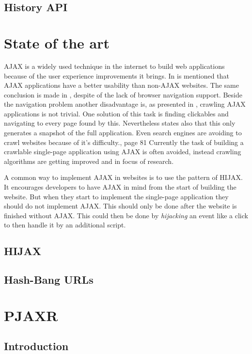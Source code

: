 \documentclass[f,bachelor,binding,twoside,palatino]{WeSTthesis}
\def \ajax {AJAX}
\def \pjaxr {PJAXR}
\def \hijax {HIJAX}
\def \singlePageApplication {single-page application}
\begin{document}
\subsection{History API}

\section{State of the art}
\ajax{} is a widely used technique in the internet to build web applications because of the user experience improvements it brings.
In \cite{roodt06} is mentioned that \ajax{} applications have a better usability than non-\ajax{} websites.
The same conclusion is made in \cite{klugeKarglWeber07}, despite of the lack of browser navigation support.
Beside the navigation problem another disadvantage is, as presented in \cite{mesbah09}, crawling \ajax{} applications is not trivial.
One solution of this task is finding clickables and navigating to every page found by this.
Nevertheless \cite{mesbah09} states also that this only generates a snapshot of the full application.
Even search engines are avoiding to crawl websites because of it's difficulty.\cite{matter08}, page 81
Currently the task of building a crawlable \singlePageApplication{} using \ajax{} is often avoided, instead crawling algorithms are getting improved and in focus of research.

A common way to implement \ajax{} in websites is to use the pattern of HIJAX.
It encourages developers to have \ajax{} in mind from the start of building the website. 
But when they start to implement the \singlePageApplication{} they should do not implement \ajax{}.
This should only be done after the website is finished without \ajax{}.
This could then be done by \emph{hijacking} an event like a click to then handle it by an additional script.

\subsection{\hijax{}}

\subsection{Hash-Bang URLs}

\section{\pjaxr{}}
\subsection{Introduction}
\end{document}
